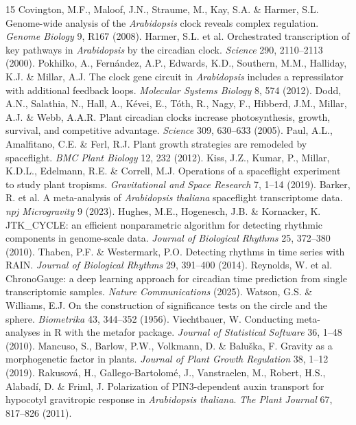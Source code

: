 \documentclass[11pt,a4paper]{article}
\begin{document}
\begin{thebibliography}{15}
 Covington, M.F., Maloof, J.N., Straume, M., Kay, S.A. \& Harmer, S.L. Genome-wide analysis of the \textit{Arabidopsis} clock reveals complex regulation. \textit{Genome Biology} 9, R167 (2008).
 Harmer, S.L. et al. Orchestrated transcription of key pathways in \textit{Arabidopsis} by the circadian clock. \textit{Science} 290, 2110--2113 (2000).
 Pokhilko, A., Fern\'andez, A.P., Edwards, K.D., Southern, M.M., Halliday, K.J. \& Millar, A.J. The clock gene circuit in \textit{Arabidopsis} includes a repressilator with additional feedback loops. \textit{Molecular Systems Biology} 8, 574 (2012).
 Dodd, A.N., Salathia, N., Hall, A., K\'evei, E., T\'oth, R., Nagy, F., Hibberd, J.M., Millar, A.J. \& Webb, A.A.R. Plant circadian clocks increase photosynthesis, growth, survival, and competitive advantage. \textit{Science} 309, 630--633 (2005).
 Paul, A.L., Amalfitano, C.E. \& Ferl, R.J. Plant growth strategies are remodeled by spaceflight. \textit{BMC Plant Biology} 12, 232 (2012).
 Kiss, J.Z., Kumar, P., Millar, K.D.L., Edelmann, R.E. \& Correll, M.J. Operations of a spaceflight experiment to study plant tropisms. \textit{Gravitational and Space Research} 7, 1--14 (2019).
 Barker, R. et al. A meta-analysis of \textit{Arabidopsis thaliana} spaceflight transcriptome data. \textit{npj Microgravity} 9 (2023).
 Hughes, M.E., Hogenesch, J.B. \& Kornacker, K. JTK\_CYCLE: an efficient nonparametric algorithm for detecting rhythmic components in genome-scale data. \textit{Journal of Biological Rhythms} 25, 372--380 (2010).
 Thaben, P.F. \& Westermark, P.O. Detecting rhythms in time series with RAIN. \textit{Journal of Biological Rhythms} 29, 391--400 (2014).
 Reynolds, W. et al. ChronoGauge: a deep learning approach for circadian time prediction from single transcriptomic samples. \textit{Nature Communications} (2025).
 Watson, G.S. \& Williams, E.J. On the construction of significance tests on the circle and the sphere. \textit{Biometrika} 43, 344--352 (1956).
 Viechtbauer, W. Conducting meta-analyses in R with the metafor package. \textit{Journal of Statistical Software} 36, 1--48 (2010).
 Mancuso, S., Barlow, P.W., Volkmann, D. \& Balu\v{s}ka, F. Gravity as a morphogenetic factor in plants. \textit{Journal of Plant Growth Regulation} 38, 1--12 (2019).
 Rakusov\'a, H., Gallego-Bartolom\'e, J., Vanstraelen, M., Robert, H.S., Alabad\'i, D. \& Friml, J. Polarization of PIN3-dependent auxin transport for hypocotyl gravitropic response in \textit{Arabidopsis thaliana}. \textit{The Plant Journal} 67, 817--826 (2011).
\end{thebibliography}
\end{document}
